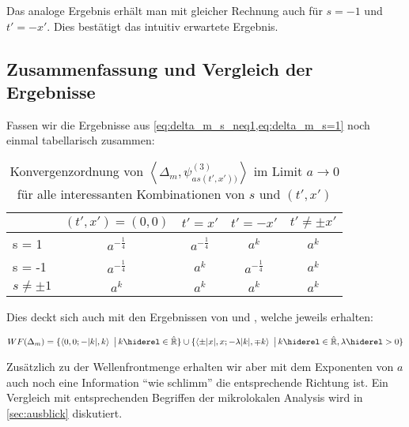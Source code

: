 Das analoge Ergebnis erhält man mit gleicher Rechnung auch für $s=-1$ und $t' = -x'$.
Dies bestätigt das intuitiv erwartete Ergebnis.

\subsection{Zusammenfassung und Vergleich der Ergebnisse}
 Fassen wir die Ergebnisse aus
 \cref{eq:delta_m_s_neq1,eq:delta_m_s=1} noch einmal tabellarisch zusammen:

\begin{table}[h]
\centering
\begin{tabular}{l|cccc}
        & \multicolumn{1}{l}{$(t', x') = (0, 0)$} & \multicolumn{1}{l}{$t' = x'$} & \multicolumn{1}{l}{$t' = -x'$} & \multicolumn{1}{l}{$t' \neq \pm x'$} \\ \hline
s = 1   & $a^{-\frac{1}{4}}$    & $a^{-\frac{1}{4}}$    & $a^k$  & $a^k$    \\
s = -1  & $a^{-\frac{1}{4}}$    & $a^k$    & $a^{-\frac{1}{4}}$  & $a^k$    \\
$s \neq \pm 1$  & $a^k$         & $a^k$    & $a^k$               & $a^k$    \\
\end{tabular}
\caption{Konvergenzordnung von $\left<\Delta_m, \psi_{as(t',x'))}^{(3)}\right>$ im Limit $a \rightarrow 0$ für alle interessanten Kombinationen von $s$ und $(t',x')$}
\label{tab:wavefront_set_massive_two_point_function}
\end{table}


Dies deckt sich auch mit den Ergebnissen von \textcite{Schulz2014} und \textcite{Hoermander1985}, welche jeweils erhalten:

\begin{dmath*}
    WF(\Delta_m) =
    \{\left\langle 0,0; -|k|,k\right\rangle\ \big|\, k \hiderel\in \hat{\mathbb{R}}\}
    \cup
    \{\left\langle \pm |x|, x; -\lambda |k|,\mp k\right\rangle\ \big|\, k \hiderel\in \hat{\mathbb{R}}, \lambda \hiderel> 0\}
\end{dmath*}


Zusätzlich zu der Wellenfrontmenge erhalten wir aber mit dem Exponenten von $a$ auch noch eine Information "`wie schlimm"' die entsprechende Richtung ist. Ein Vergleich mit entsprechenden Begriffen der mikrolokalen Analysis wird in \cref{sec:ausblick} diskutiert.
